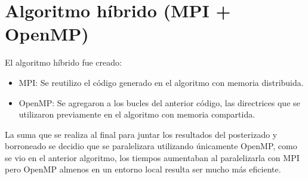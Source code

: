 \section{Algoritmo híbrido (MPI + OpenMP)}
 
El algoritmo híbrido fue creado:
\begin{itemize}
      \item MPI: Se reutilizo el código generado en el algoritmo con memoria distribuida.
      \item OpenMP: Se agregaron a los bucles del anterior código, las directrices que se utilizaron previamente en el algoritmo con memoria compartida.
\end{itemize}
La suma que se realiza al final para juntar los resultados del posterizado y borroneado se decidio que se paralelizara utilizando únicamente OpenMP, como se vio en el anterior algoritmo, los tiempos aumentaban al paralelizarla con MPI pero OpenMP almenos en un entorno local resulta ser mucho más eficiente.
 
